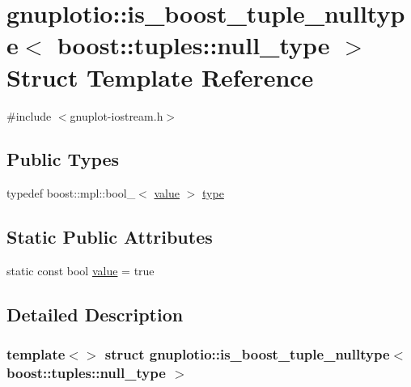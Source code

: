 \hypertarget{structgnuplotio_1_1is__boost__tuple__nulltype_3_01boost_1_1tuples_1_1null__type_01_4}{}\section{gnuplotio\+:\+:is\+\_\+boost\+\_\+tuple\+\_\+nulltype$<$ boost\+:\+:tuples\+:\+:null\+\_\+type $>$ Struct Template Reference}
\label{structgnuplotio_1_1is__boost__tuple__nulltype_3_01boost_1_1tuples_1_1null__type_01_4}


{\ttfamily \#include $<$gnuplot-\/iostream.\+h$>$}

\subsection*{Public Types}
\begin{DoxyCompactItemize}
\item 
typedef boost\+::mpl\+::bool\+\_\+$<$ \hyperlink{structgnuplotio_1_1is__boost__tuple__nulltype_3_01boost_1_1tuples_1_1null__type_01_4_ae7fc5c63a7b01851c7ce12dbf634cfea}{value} $>$ \hyperlink{structgnuplotio_1_1is__boost__tuple__nulltype_3_01boost_1_1tuples_1_1null__type_01_4_aab5c47dbae2148f1e9ed4d89f25f21fd}{type}
\end{DoxyCompactItemize}
\subsection*{Static Public Attributes}
\begin{DoxyCompactItemize}
\item 
static const bool \hyperlink{structgnuplotio_1_1is__boost__tuple__nulltype_3_01boost_1_1tuples_1_1null__type_01_4_ae7fc5c63a7b01851c7ce12dbf634cfea}{value} = true
\end{DoxyCompactItemize}


\subsection{Detailed Description}
\subsubsection*{template$<$$>$\newline
struct gnuplotio\+::is\+\_\+boost\+\_\+tuple\+\_\+nulltype$<$ boost\+::tuples\+::null\+\_\+type $>$}



